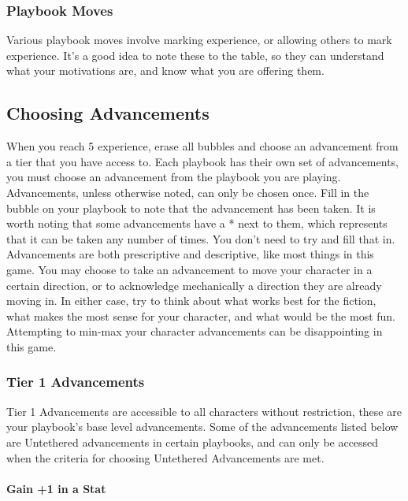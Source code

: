 \documentclass[
]{article}
\begin{document}
\hypertarget{playbook-moves}{%
\subsubsection{Playbook Moves}\label{playbook-moves}}

Various playbook moves involve marking experience, or allowing others to
mark experience. It's a good idea to note these to the table, so they
can understand what your motivations are, and know what you are offering
them.

\hypertarget{choosing-advancements}{%
\subsection{Choosing Advancements}\label{choosing-advancements}}

When you reach 5 experience, erase all bubbles and choose an advancement
from a tier that you have access to. Each playbook has their own set of
advancements, you must choose an advancement from the playbook you are
playing. Advancements, unless otherwise noted, can only be chosen once.
Fill in the bubble on your playbook to note that the advancement has
been taken. It is worth noting that some advancements have a * next to
them, which represents that it can be taken any number of times. You
don't need to try and fill that in. Advancements are both prescriptive
and descriptive, like most things in this game. You may choose to take
an advancement to move your character in a certain direction, or to
acknowledge mechanically a direction they are already moving in. In
either case, try to think about what works best for the fiction, what
makes the most sense for your character, and what would be the most fun.
Attempting to min-max your character advancements can be disappointing
in this game.

\hypertarget{tier-1-advancements}{%
\subsubsection{Tier 1 Advancements}\label{tier-1-advancements}}

Tier 1 Advancements are accessible to all characters without
restriction, these are your playbook's base level advancements. Some of
the advancements listed below are Untethered advancements in certain
playbooks, and can only be accessed when the criteria for choosing
Untethered Advancements are met.

\hypertarget{gain-1-in-a-stat}{%
\paragraph{Gain +1 in a Stat}\label{gain-1-in-a-stat}}
\end{document}
